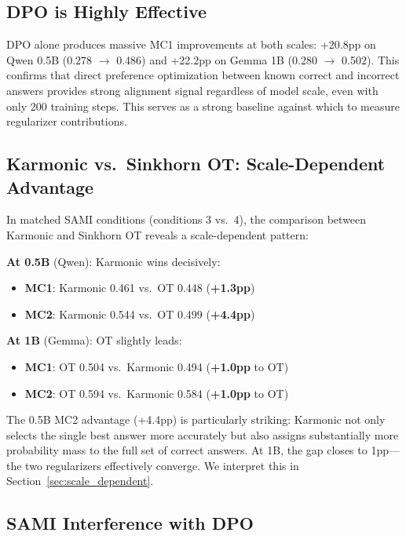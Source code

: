 \documentclass[11pt,a4paper]{article}
\begin{document}
\subsection{DPO is Highly Effective}

DPO alone produces massive MC1 improvements at both scales: +20.8pp on Qwen 0.5B (0.278 $\rightarrow$ 0.486) and +22.2pp on Gemma 1B (0.280 $\rightarrow$ 0.502). This confirms that direct preference optimization between known correct and incorrect answers provides strong alignment signal regardless of model scale, even with only 200 training steps. This serves as a strong baseline against which to measure regularizer contributions.

\subsection{Karmonic vs.\ Sinkhorn OT: Scale-Dependent Advantage}

In matched SAMI conditions (conditions 3 vs.\ 4), the comparison between Karmonic and Sinkhorn OT reveals a scale-dependent pattern:

\textbf{At 0.5B} (Qwen): Karmonic wins decisively:
\begin{itemize}
    \item \textbf{MC1}: Karmonic 0.461 vs.\ OT 0.448 (\textbf{+1.3pp})
    \item \textbf{MC2}: Karmonic 0.544 vs.\ OT 0.499 (\textbf{+4.4pp})
\end{itemize}

\textbf{At 1B} (Gemma): OT slightly leads:
\begin{itemize}
    \item \textbf{MC1}: OT 0.504 vs.\ Karmonic 0.494 (\textbf{+1.0pp} to OT)
    \item \textbf{MC2}: OT 0.594 vs.\ Karmonic 0.584 (\textbf{+1.0pp} to OT)
\end{itemize}

The 0.5B MC2 advantage (+4.4pp) is particularly striking: Karmonic not only selects the single best answer more accurately but also assigns substantially more probability mass to the full set of correct answers. At 1B, the gap closes to 1pp---the two regularizers effectively converge. We interpret this in Section~\ref{sec:scale_dependent}.

\subsection{SAMI Interference with DPO}
\end{document}
